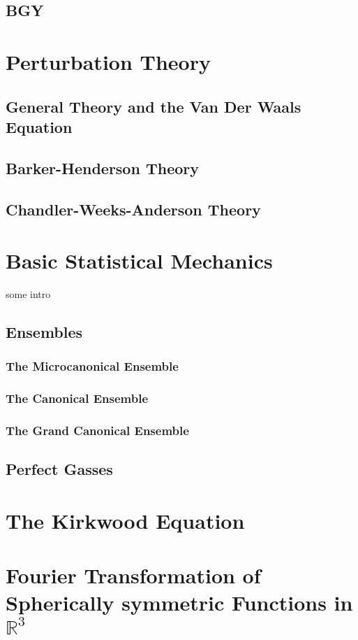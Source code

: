 \documentclass[a4paper,11pt]{article}
\begin{document}
\subsection{BGY}


\section{Perturbation Theory}
\subsection{General Theory and the Van Der Waals Equation}
\subsection{Barker-Henderson Theory}
\subsection{Chandler-Weeks-Anderson Theory}

\appendix

\section{Basic Statistical Mechanics}\label{sec:basic}

some intro

\subsection{Ensembles}\label{sec:enembles}
\subsubsection{The Microcanonical Ensemble}
\subsubsection{The Canonical Ensemble}
\subsubsection{The Grand Canonical Ensemble}
\subsection{Perfect Gasses}\label{sec:perfect}


\section{The Kirkwood Equation}\label{sec:app_kirkwood}

\section{Fourier Transformation of Spherically symmetric Functions in $\mathbb{R}^3$}\label{sec:ft_3d}

\cite{hansen1990theory}
\cite{mcquarrie2000statistical}
\cite{press1992numerical}


\end{document}
